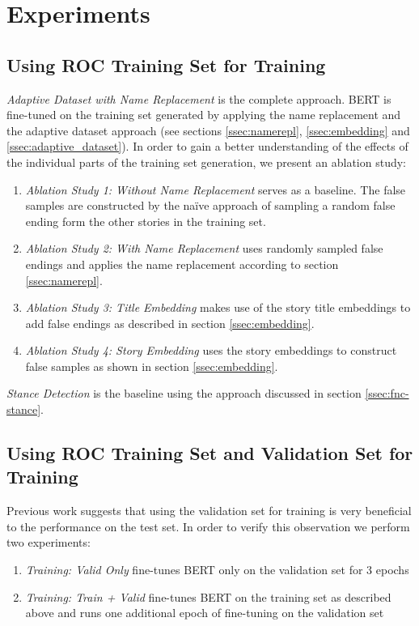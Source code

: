 \documentclass{article}
\begin{document}
\section{Experiments}
\subsection{Using ROC Training Set for Training}

\emph{Adaptive Dataset with Name Replacement} is the complete approach.
BERT is fine-tuned on the training set generated by applying the name replacement and the adaptive dataset approach (see sections \ref{ssec:namerepl}, \ref{ssec:embedding} and \ref{ssec:adaptive_dataset}).
In order to gain a better understanding of the effects of the individual parts of the training set generation, we present an ablation study:

\begin{enumerate}
    \item \emph{Ablation Study 1: Without Name Replacement} serves as a baseline. The false samples are constructed by the naïve approach of sampling a random false ending form the other stories in the training set.
    \item \emph{Ablation Study 2: With Name Replacement} uses randomly sampled false endings and applies the name replacement according to section \ref{ssec:namerepl}.
    \item \emph{Ablation Study 3: Title Embedding} makes use of the story title embeddings to add  false endings as described in section \ref{ssec:embedding}.
    \item \emph{Ablation Study 4: Story Embedding} uses the story embeddings to construct false samples as shown in section \ref{ssec:embedding}.
\end{enumerate}

\emph{Stance Detection} is the baseline using the approach discussed in section \ref{ssec:fnc-stance}.

\subsection{Using ROC Training Set and Validation Set for Training}

Previous work \cite{DBLP:journals/corr/abs-1803-05547} suggests that using the validation set for training is very beneficial to the performance on the test set.
In order to verify this observation we perform two experiments: 
\begin{enumerate}
\item \emph{Training: Valid Only} fine-tunes BERT only on the validation set for 3 epochs
\item \emph{Training: Train + Valid} fine-tunes BERT on the training set as described above and runs one additional epoch of fine-tuning on the validation set
\end{enumerate}
\end{document}

